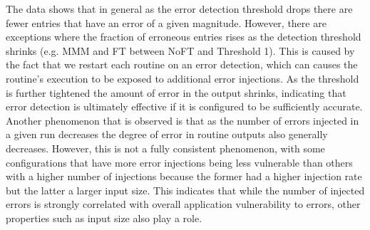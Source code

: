 \documentclass{sig-alternate}
\newcommand{\sui}[1]{%
  \textcolor{green}{SC-#1}
}
\newcommand{\greg}[1]{%
  \textcolor{blue}{GB: #1}
}
\begin{document}
The data shows that in general as the error detection threshold drops there are fewer entries that have an error of a given magnitude.
However, there are exceptions where the fraction of erroneous entries rises as the detection threshold shrinks (e.g. MMM and FT between NoFT and Threshold 1).
This is caused by the fact that we restart each routine on an error detection, which can causes the routine's execution to be exposed to additional error injections.
As the threshold is further tightened the amount of error in the output shrinks, indicating that error detection is ultimately effective if it is configured to be sufficiently accurate.
Another phenomenon that is observed is that as the number of errors injected in a given run decreases the degree of error in routine outputs also generally decreases.
However, this is not a fully consistent phenomenon, with some configurations that have more error injections being less vulnerable than others with a higher number of injections because the former had a higher injection rate but the latter a larger input size.
This indicates that while the number of injected errors is strongly correlated with overall application vulnerability to errors, other properties such as input size also play a role.

\end{document}
